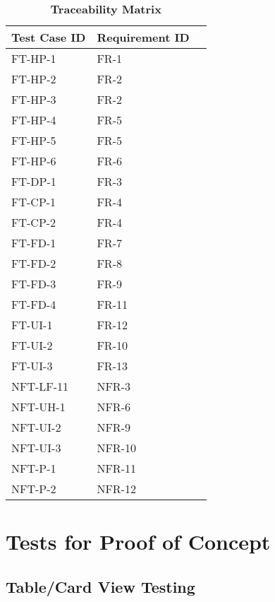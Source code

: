 \documentclass[12pt, titlepage]{article}
\begin{document}
\begin{table}[!ht]
    \centering
     
    \begin{tabular}{|l|l|l|}
    \hline
        Test Case ID & Requirement ID \\ \hline
        FT-HP-1 & FR-1 \\ \hline
        FT-HP-2 & FR-2 \\ \hline
        FT-HP-3 & FR-2 \\ \hline
        FT-HP-4 & FR-5 \\ \hline
        FT-HP-5 & FR-5 \\ \hline
        FT-HP-6 & FR-6 \\ \hline
        FT-DP-1 & FR-3 \\ \hline
        FT-CP-1 & FR-4 \\ \hline
        FT-CP-2 & FR-4 \\ \hline
        FT-FD-1 & FR-7 \\ \hline
        FT-FD-2 & FR-8 \\ \hline
        FT-FD-3 & FR-9 \\ \hline
        FT-FD-4 & FR-11 \\ \hline
        FT-UI-1 & FR-12 \\ \hline
        FT-UI-2 & FR-10 \\ \hline
        FT-UI-3 & FR-13 \\ \hline
        NFT-LF-11 & NFR-3 \\ \hline
        NFT-UH-1 & NFR-6 \\ \hline
        NFT-UI-2 & NFR-9 \\ \hline
        NFT-UI-3 & NFR-10 \\ \hline
        NFT-P-1 & NFR-11 \\ \hline
        NFT-P-2 & NFR-12 \\ \hline
    \end{tabular}
    \label{Table}
    \caption{\textbf{Traceability Matrix}}
\end{table}

\section{Tests for Proof of Concept}

\subsection{Table/Card View Testing}
		
\end{document}
